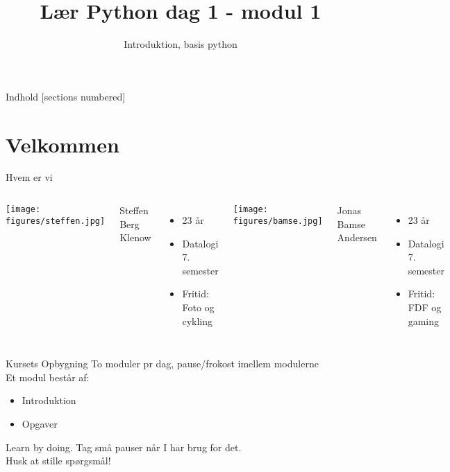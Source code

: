 

\title{Lær Python dag 1 - modul 1}
\subtitle{Introduktion, basis python}



\maketitle

\begin{frame}{Indhold}
  [sections numbered]
  \tableofcontents[hideallsubsections]
\end{frame}

\section{Velkommen}

\begin{frame}[fragile]{Hvem er vi}
	\begin{columns}
			\begin{center}
				\texttt{[image: figures/steffen.jpg]}
			\end{center}
			Steffen Berg Klenow
			\begin{itemize}
				\item 23 år
				\item Datalogi 7. semester
				\item Fritid: Foto og cykling
			\end{itemize}
			\begin{center}
				\texttt{[image: figures/bamse.jpg]}
			\end{center}
			Jonas Bamse Andersen
			\begin{itemize}
				\item 23 år
				\item Datalogi 7. semester
				\item Fritid: FDF og gaming
			\end{itemize}
	\end{columns}
\end{frame}

\begin{frame}[fragile]{Kursets Opbygning}
	To moduler pr dag, pause/frokost imellem modulerne\\
	Et modul består af:
	\begin{itemize}
		\item Introduktion
		\item Opgaver
	\end{itemize}
	\vfill
	Learn by doing. Tag små pauser når I har brug for det.\\
	Husk at stille spørgsmål!
\end{frame}

